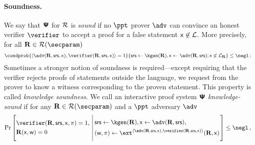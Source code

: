 \documentclass[runningheads,10pt]{llncs}
\begin{document}
\paragraph{Soundness.}
    We say that $\bm{\mathsf{\Psi}}$ for $\mathcal{R}$ is \emph{sound} if no
  $\ppt$ prover $\adv$ can convince an honest verifier $\verifier$ to accept a
  proof for a false statement $\mathsf{x} \not\in\mathcal{L}$. More precisely, for
  all $\REL \in \RELGEN(\secparam)$
	\[
      \condprob{\ip{\adv(\REL, \srs, \inp)}{\verifier(\REL, \srs, \inp)} =
        1}{\srs \gets \kgen(\REL), \inp \gets \adv(\REL, \srs); \inp \not\in
        \LANG_\REL} \leq \negl\,;
	\]
Sometimes a stronger notion of soundness is required---except requiring that the
verifier rejects proofs of statements outside the language, we request from the
prover to know a witness corresponding to the proven statement. This property is
called \emph{knowledge soundness}.
We call an interactive proof system $\bm{\mathsf{\Psi}}$
\emph{knowledge-sound} if for any $\REL \in \RELGEN(\secparam)$ and a $\ppt$
adversary $\adv$
	\[
	\Pr\left[
		\begin{aligned}
			& \verifier(\REL, \srs, \inp, \zkproof) = 1, \\
			& \REL(\inp, \wit) = 0
	 \end{aligned}
	  \,\left|\,
	 \begin{aligned}
		 & \srs \gets \kgen(\REL), \inp \gets \adv(\REL, \srs), \\
		 & (\wit, \zkproof) \gets \ext^{\ip{\adv(\REL, \srs, \inp)}{\verifier(\REL, \srs, \inp)}}(\REL, \inp)
	 \end{aligned}
	 \vphantom{\begin{aligned}
		 \adv (\zkproof) = 1, \\
		 \text{if $\zkproof{}$ is accepting} \\
		 \pcind \text{then $\REL(\inp, \wit)$}
	 \end{aligned}}\right.
	 \right] \leq \negl\,,
 \]

\end{document}
